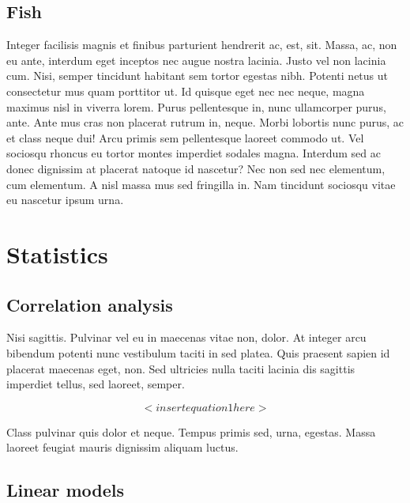 \documentclass[
  11pt,
]{report}
\begin{document}
\hypertarget{fish}{%
\subsection{Fish}\label{fish}}

Integer facilisis magnis et finibus parturient hendrerit ac, est, sit.
Massa, ac, non eu ante, interdum eget inceptos nec augue nostra lacinia.
Justo vel non lacinia cum. Nisi, semper tincidunt habitant sem tortor
egestas nibh. Potenti netus ut consectetur mus quam porttitor ut. Id
quisque eget nec nec neque, magna maximus nisl in viverra lorem. Purus
pellentesque in, nunc ullamcorper purus, ante. Ante mus cras non
placerat rutrum in, neque. Morbi lobortis nunc purus, ac et class neque
dui! Arcu primis sem pellentesque laoreet commodo ut. Vel sociosqu
rhoncus eu tortor montes imperdiet sodales magna. Interdum sed ac donec
dignissim at placerat natoque id nascetur? Nec non sed nec elementum,
cum elementum. A nisl massa mus sed fringilla in. Nam tincidunt sociosqu
vitae eu nascetur ipsum urna.

\hypertarget{statistics}{%
\section{Statistics}\label{statistics}}

\hypertarget{correlation-analysis}{%
\subsection{Correlation analysis}\label{correlation-analysis}}

Nisi sagittis. Pulvinar vel eu in maecenas vitae non, dolor. At integer
arcu bibendum potenti nunc vestibulum taciti in sed platea. Quis
praesent sapien id placerat maecenas eget, non. Sed ultricies nulla
taciti lacinia dis sagittis imperdiet tellus, sed laoreet, semper.

\begin{equation}
  <insert equation 1 here>
\end{equation}

Class pulvinar quis dolor et neque. Tempus primis sed, urna, egestas.
Massa laoreet feugiat mauris dignissim aliquam luctus.

\hypertarget{linear-models}{%
\subsection{Linear models}\label{linear-models}}
\end{document}
